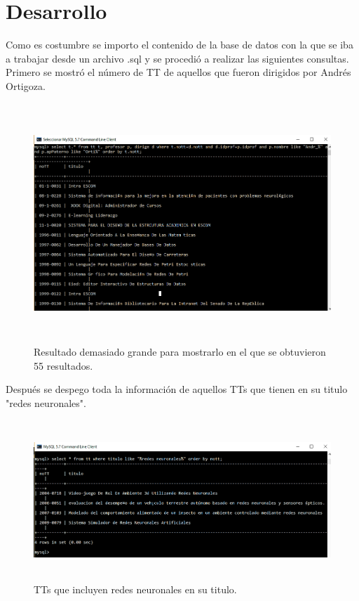 \documentclass[12pt, titlepage]{article}
\begin{document}
	\section{Desarrollo}
	Como es costumbre se importo el contenido de la base de datos con la que se iba a trabajar desde un archivo .sql y se procedió a realizar las siguientes consultas.
	Primero se mostró el número de TT de aquellos que fueron dirigidos por Andrés Ortigoza.
		\begin{figure}[H]
		\begin{center}
			\includegraphics[width=16cm, height=9cm]{img/uno.png}
			\caption{Resultado demasiado grande para mostrarlo en el que se obtuvieron 55 resultados.}
			\label{fig:ejercicio1}
		\end{center}
	\end{figure}
	Después se despego toda la información de aquellos TTs que tienen en su titulo "redes neuronales".
		\begin{figure}[H]
		\begin{center}
			\includegraphics[width=16cm, height=6cm]{img/dos.png}
			\caption{TTs que incluyen redes neuronales en su titulo.}
			\label{fig:dos}
		\end{center}
	\end{figure}
\end{document}
